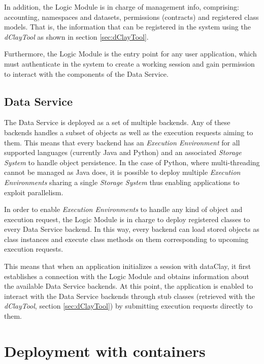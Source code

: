 In addition, the Logic Module is in charge of management info, comprising: accounting, namespaces and datasets, permissions (contracts) and registered class models. That is, the information that can be registered in the system using the \textit{dClayTool} as shown in section \ref{sec:dClayTool}.

Furthermore, the Logic Module is the entry point for any user application, which must authenticate in the system to create a working session and gain permission to interact with the components of the Data Service.

\subsection{Data Service}
\label{sec:DataService}
The Data Service is deployed as a set of multiple backends. Any of these backends handles a subset of objects as well as the execution requests aiming to them. This means that every backend has an \textit{Execution Environment} for all supported languages (currently Java and Python) and an associated \textit{Storage System} to handle object persistence. In the case of Python, where multi-threading cannot be managed as Java does, it is possible to deploy multiple \textit{Execution Environments} sharing a single \textit{Storage System} thus enabling applications to exploit parallelism.

In order to enable \textit{Execution Environments} to handle any kind of object and execution request, the Logic Module is in charge to deploy registered classes to every Data Service backend. In this way, every backend can load stored objects as class instances and execute class methods on them corresponding to upcoming execution requests.

This means that when an application initializes a session with dataClay, it first establishes a connection with the Logic Module and obtains information about the available Data Service backends. At this point, the application is enabled to interact with the Data Service backends through stub classes (retrieved with the \textit{dClayTool}, section \ref{sec:dClayTool}) by submitting execution requests directly to them.



\section{Deployment with containers }

